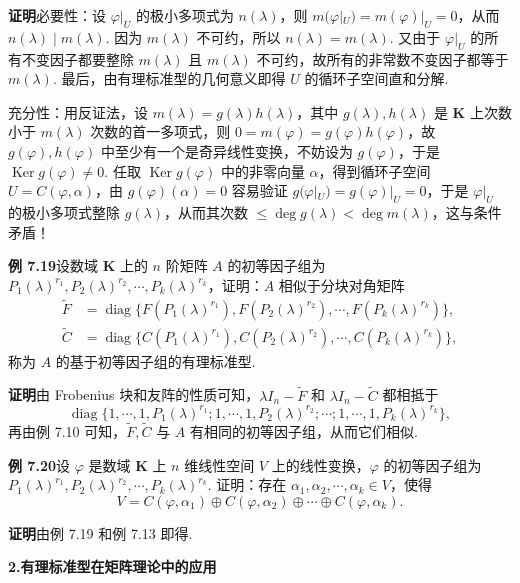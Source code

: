 \documentclass[UTF8,12pt,a4paper,fontset=fandol]{ctexart}
\begin{document}
\noindent\textbf{证明}\quad 必要性：设 $\varphi|_U$ 的极小多项式为 $n(\lambda)$，则 $m(\varphi|_U)=m(\varphi)|_U=0$，从而 $n(\lambda)\mid m(\lambda)$. 因为 $m(\lambda)$ 不可约，所以 $n(\lambda)=m(\lambda)$. 又由于 $\varphi|_U$ 的所有不变因子都要整除 $m(\lambda)$ 且 $m(\lambda)$ 不可约，故所有的非常数不变因子都等于 $m(\lambda)$. 最后，由有理标准型的几何意义即得 $U$ 的循环子空间直和分解.

充分性：用反证法，设 $m(\lambda)=g(\lambda)h(\lambda)$，其中 $g(\lambda),h(\lambda)$ 是 $\mathbf{K}$ 上次数小于 $m(\lambda)$ 次数的首一多项式，则 $0=m(\varphi)=g(\varphi)h(\varphi)$，故 $g(\varphi),h(\varphi)$ 中至少有一个是奇异线性变换，不妨设为 $g(\varphi)$，于是 $\operatorname{Ker}g(\varphi)\ne 0$. 任取 $\operatorname{Ker}g(\varphi)$ 中的非零向量 $\alpha$，得到循环子空间 $U=C(\varphi,\alpha)$，由 $g(\varphi)(\alpha)=0$ 容易验证 $g(\varphi|_U)=g(\varphi)|_U=0$，于是 $\varphi|_U$ 的极小多项式整除 $g(\lambda)$，从而其次数 $\le\deg g(\lambda)<\deg m(\lambda)$，这与条件矛盾！

\noindent\textbf{例 7.19}\quad 设数域 $\mathbf{K}$ 上的 $n$ 阶矩阵 $A$ 的初等因子组为 $P_1(\lambda)^{r_1},P_2(\lambda)^{r_2},\cdots,P_k(\lambda)^{r_k}$，证明：$A$ 相似于分块对角矩阵
\[
\begin{array}{rl}
\widetilde{F}&=\operatorname{diag}\{F(P_1(\lambda)^{r_1}),F(P_2(\lambda)^{r_2}),\cdots,F(P_k(\lambda)^{r_k})\},\\
\widetilde{C}&=\operatorname{diag}\{C(P_1(\lambda)^{r_1}),C(P_2(\lambda)^{r_2}),\cdots,C(P_k(\lambda)^{r_k})\},
\end{array}
\]
称为 $A$ 的基于初等因子组的有理标准型.

\noindent\textbf{证明}\quad 由 Frobenius 块和友阵的性质可知，$\lambda I_n-\widetilde{F}$ 和 $\lambda I_n-\widetilde{C}$ 都相抵于
\[
\operatorname{diag}\{1,\cdots,1,P_1(\lambda)^{r_1};1,\cdots,1,P_2(\lambda)^{r_2};\cdots;1,\cdots,1,P_k(\lambda)^{r_k}\},
\]
再由例 7.10 可知，$\widetilde{F},\widetilde{C}$ 与 $A$ 有相同的初等因子组，从而它们相似.

\noindent\textbf{例 7.20}\quad 设 $\varphi$ 是数域 $\mathbf{K}$ 上 $n$ 维线性空间 $V$ 上的线性变换，$\varphi$ 的初等因子组为 $P_1(\lambda)^{r_1},P_2(\lambda)^{r_2},\cdots,P_k(\lambda)^{r_k}$. 证明：存在 $\alpha_1,\alpha_2,\cdots,\alpha_k\in V$，使得
\[
V=C(\varphi,\alpha_1)\oplus C(\varphi,\alpha_2)\oplus\cdots\oplus C(\varphi,\alpha_k).
\]

\noindent\textbf{证明}\quad 由例 7.19 和例 7.13 即得.

\noindent\textbf{2.\quad 有理标准型在矩阵理论中的应用}
\end{document}
